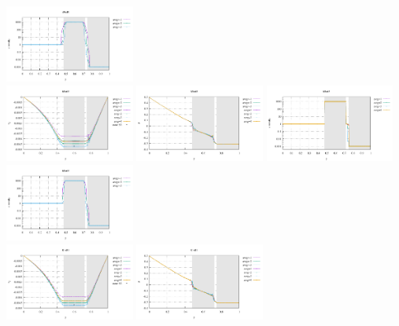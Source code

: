 \begin{center}
\includegraphics[width=4.25cm]{python_codes/fieldstone_41/results/exp3/49x49/profile_eta_nodal.pdf}\\
\includegraphics[width=4.25cm]{python_codes/fieldstone_41/results/exp3/65x65/profile_v.pdf}
\includegraphics[width=4.25cm]{python_codes/fieldstone_41/results/exp3/65x65/profile_p.pdf}
\includegraphics[width=4.25cm]{python_codes/fieldstone_41/results/exp3/65x65/profile_eta_elemental.pdf}
\includegraphics[width=4.25cm]{python_codes/fieldstone_41/results/exp3/65x65/profile_eta_nodal.pdf}\\
\includegraphics[width=4.25cm]{python_codes/fieldstone_41/results/exp3/81x81/profile_v.pdf}
\includegraphics[width=4.25cm]{python_codes/fieldstone_41/results/exp3/81x81/profile_p.pdf}

\end{center}
